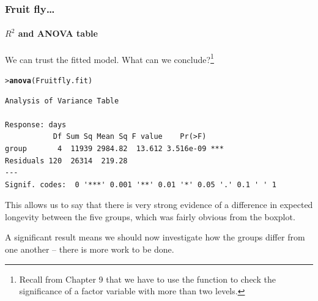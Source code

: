 \documentclass{beamer}\usepackage[]{graphicx}\usepackage[]{xcolor}
\makeatletter
\newcommand{\hlstd}[1]{\textcolor[rgb]{0.345,0.345,0.345}{#1}}%
\newcommand{\hlkwd}[1]{\textcolor[rgb]{0.737,0.353,0.396}{\textbf{#1}}}%
\newenvironment{kframe}{%
 \def\at@end@of@kframe{}%
 \ifinner\ifhmode%
  \def\at@end@of@kframe{\end{minipage}}%
  \begin{minipage}{\columnwidth}%
 \fi\fi%
 \def\FrameCommand##1{\hskip\@totalleftmargin \hskip-\fboxsep
 \colorbox{shadecolor}{##1}\hskip-\fboxsep
     \hskip-\linewidth \hskip-\@totalleftmargin \hskip\columnwidth}%
 \MakeFramed {\advance\hsize-\width
   \@totalleftmargin\z@ \linewidth\hsize
   \@setminipage}}%
 {\par\unskip\endMakeFramed%
 \at@end@of@kframe}
\newenvironment{knitrout}{}{} %
\makeatother
\begin{document}
\begin{frame}[fragile, label={fruitfly_anova}]
\frametitle{Fruit fly\ldots}
\framesubtitle{$R^2$ and ANOVA table}
We can trust the fitted model. What can we conclude?\footnote{Recall from Chapter 9 that we have to use the  function to check the significance of a factor variable with more than two levels.}
\medskip

\begin{knitrout}\scriptsize
{}\color{fgcolor}\begin{kframe}
\begin{alltt}
\hlstd{> }\hlkwd{anova}\hlstd{(Fruitfly.fit)}
\end{alltt}
\begin{verbatim}
Analysis of Variance Table

Response: days
           Df Sum Sq Mean Sq F value    Pr(>F)    
group       4  11939 2984.82  13.612 3.516e-09 ***
Residuals 120  26314  219.28                      
---
Signif. codes:  0 '***' 0.001 '**' 0.01 '*' 0.05 '.' 0.1 ' ' 1
\end{verbatim}
\end{kframe}
\end{knitrout}

\medskip

This allows us to say that there is very strong evidence of a difference in expected longevity between the five groups, which was fairly obvious from the boxplot.
\smallskip

A significant result means we should now investigate how the groups differ from one another -- there is more work to be done.

\end{frame}


\end{document}

